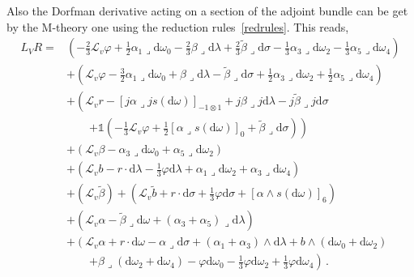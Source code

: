 \documentclass[debug]{phd}
\begin{document}
			Also the Dorfman derivative acting on a section of the adjoint bundle can be get by the M-theory one using the reduction rules~\eqref{redrules}.
			This reads,
					\begin{equation}
						\begin{split}
							L_V R  =& \left(-\frac{2}{3}\mathcal{L}_{v}\varphi+\frac{1}{2} \alpha_1 \lrcorner \mathrm{d} \omega_0	-\frac{2}{3}\beta \lrcorner \mathrm{d} \lambda+\frac{2}{3}\tilde \beta \lrcorner \mathrm{d} \sigma-\frac{1}{3} \alpha_3 \lrcorner \mathrm{d} \omega_2-\frac{1}{3} \alpha_5 \lrcorner \mathrm{d} \omega_4 \right) \\[1mm]
								&+ \left(\mathcal{L}_{v}\varphi-\frac{3}{2} \alpha_1 \lrcorner \mathrm{d} \omega_0+\beta \lrcorner \mathrm{d} \lambda-\tilde \beta \lrcorner \mathrm{d} \sigma+\frac{1}{2} \alpha_3 \lrcorner \mathrm{d} \omega_2+\frac{1}{2} \alpha_5 \lrcorner \mathrm{d} \omega_4	\right ) \\[1mm] 
								&+ \left( \mathcal{L}_{v} r  -[j\alpha \lrcorner j s(\mathrm{d} \omega)]_{-1\otimes 1} +j \beta \lrcorner j \mathrm{d} \lambda -j \tilde \beta \lrcorner j \mathrm{d} \sigma \right. \\
								& \phantom{++} \left. + \mathds{1} \left( -\frac{1}{3} \mathcal{L}_{v} \varphi	 +\frac{1}{2}[\alpha \lrcorner s(\mathrm{d}\omega)]_0  + \tilde \beta \lrcorner \mathrm{d} \sigma \right)\right ) \\[1mm]
								& + \left(\mathcal{L}_{v}\beta - \alpha_3 \lrcorner \mathrm{d} \omega_0 + \alpha_5 \lrcorner \mathrm{d} \omega_2\right ) \\[1mm]
				& + \left(\mathcal{L}_{v}b-r\cdot  \mathrm{d} \lambda	- \frac{1}{3}\varphi \mathrm{d} \lambda+\alpha_1 \lrcorner \mathrm{d} \omega_2+\alpha_3 \lrcorner \mathrm{d} \omega_4	\right ) \\[1mm]
				& + \left(\mathcal{L}_{v} \tilde \beta \right )  + \left(\mathcal{L}_{v} \tilde b 	+r\cdot \mathrm{d} \sigma	+\frac{1}{3} \varphi \mathrm{d} \sigma+[ \alpha \wedge s( \mathrm{d} \omega ) ]_6\right ) \\[1mm]
				& + \left( \mathcal{L}_{v}\alpha  -\tilde \beta \lrcorner \mathrm{d} \omega  +(\alpha_3 + \alpha_5 ) \lrcorner \mathrm{d} \lambda	\right ) \\[1mm]
				& + \left(\mathcal{L}_{v} \alpha	+r\cdot \mathrm{d} \omega -\alpha \lrcorner \mathrm{d} \sigma +(\alpha_1 +\alpha_3) \wedge \mathrm{d} \lambda+b \wedge ( \mathrm{d} \omega_0 + \mathrm{d} \omega_2) \right. \\
				& \phantom{++} \left. + \beta \lrcorner ( \mathrm{d} \omega_2 + \mathrm{d} \omega_4) -\varphi \mathrm{d} \omega_0 -\frac{1}{3} \varphi \mathrm{d} \omega_2+\frac{1}{3} \varphi \mathrm{d} \omega_4 \right) \, .
						\end{split}
					\end{equation}
\end{document}
